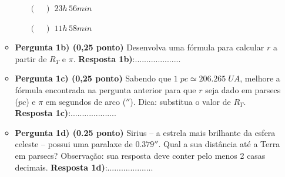 \documentclass[a4paper, 12pt]{article}
\begin{document}
\begin{flushleft}
\begin{itemize}
\begin{itemize}
\begin{itemize}
						\item[$(\quad)$] $23h \, 56min$
						\item[$(\quad)$] $11h \, 58min$
					\end{itemize}
				\item \textbf{Pergunta 1b) (0,25 ponto)} Desenvolva uma fórmula para calcular $r$ a partir de $R_T$ e $\pi$.
					\linebreak \linebreak \linebreak \linebreak \linebreak \linebreak \linebreak
					\textbf{Resposta 1b)}:....................
				\item \textbf{Pergunta 1c) (0,25 ponto)} Sabendo que $1 \; pc \simeq 206.265 \; UA$, melhore a fórmula encontrada na pergunta anterior para que $r$ seja dado em parsecs ($pc$) e $\pi$ em segundos de arco ($''$). \linebreak
					Dica: substitua o valor de $R_T$.
					\linebreak \linebreak \linebreak \linebreak \linebreak \linebreak \linebreak \linebreak \linebreak \linebreak
					\textbf{Resposta 1c)}:....................
				\item \textbf{Pergunta 1d) (0.25 ponto)} Sirius -- a estrela mais brilhante da esfera celeste -- possui uma paralaxe de $0.379''$. Qual a sua distância até a Terra em parsecs? \linebreak
					Observação: sua resposta deve conter pelo menos 2 casas decimais.
					\linebreak \linebreak \linebreak \linebreak \linebreak \linebreak \linebreak
					\textbf{Resposta 1d)}:....................
			\end{itemize}
			

\end{itemize}
\end{flushleft}
\end{document}

